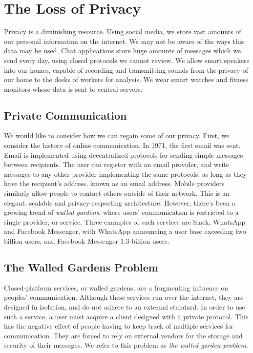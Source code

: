 \chapter{The Loss of Privacy}
Privacy is a diminishing resource.
Using social media, we store vast amounts of our personal information on the internet.
We may not be aware of the ways this data may be used.
Chat applications store huge amounts of messages which we send every day, using closed protocols we cannot review.
We allow smart speakers into our homes, capable of recording and transmitting sounds from the privacy of our home to the desks of workers for analysis\cite{mozilla_privacy_not_included}.
We wear smart watches and fitness monitors whose data is sent to central servers.

\section{Private Communication}
We would like to consider how we can regain some of our privacy.
First, we consider the history of online communication.
In 1971, the first email was sent\cite{tomlinson2009first}.
Email is implemented using decentralized protocols for sending simple messages between recipients\cite{RFC5321}.
The user can register with an email provider, and write messages to any other provider implementing the same protocols, as long as they have the recipient's address, known as an email address.
Mobile providers similarly allow people to contact others outside of their network.
This is an elegant, scalable and privacy-respecting architecture.
However, there's been a growing trend of \textit{walled gardens}\cite{walled_gardens_gunnar_wolf_acm_2018}, where users' communication is restricted to a single provider, or service.
Three examples of such services are Slack, WhatsApp and Facebook Messenger, with WhatsApp announcing a user base exceeding two billion users, and Facebook Messenger 1.3 billion users\cite{walled_gardens_gunnar_wolf_acm_2018,whatsapp_2b_users_archive_org,messenger_1pt3b_users}.

\section{The Walled Gardens Problem}\label{subsec:initial_problem_statement}
Closed-platform services, or walled gardens, are a fragmenting influence on peoples' communication.
Although these services run over the internet, they are designed in isolation, and do not adhere to an external standard.
In order to use such a service, a user must acquire a client designed with a private protocol.
This has the negative effect of people having to keep track of multiple services for communication.
They are forced to rely on external vendors for the storage and security of their messages.
We refer to this problem as \textit{the walled garden problem}.

